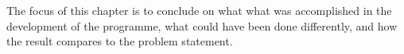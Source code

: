 The focus of this chapter is to conclude on what what was accomplished in the development of the programme, what could have been done differently, and how the result compares to the problem statement.